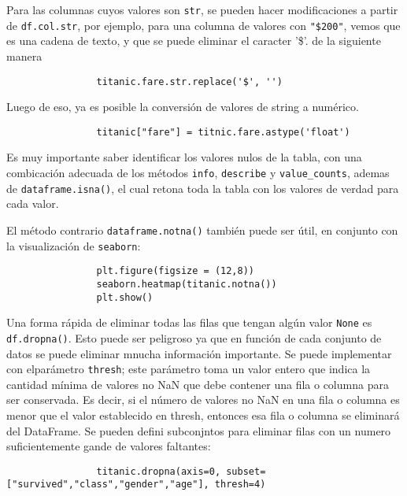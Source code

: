             Para las columnas cuyos valores son \texttt{str}, se pueden hacer modificaciones a partir de \texttt{df.col.str}, por ejemplo, para una columna de valores con \texttt{"\$200"}, vemos que es una cadena de texto, y que se puede eliminar el caracter '\$'. de la siguiente manera

            \begin{verbatim}
                titanic.fare.str.replace('$', '')
            \end{verbatim}

            Luego de eso, ya es posible la conversión de valores de string a numérico.
            
            \begin{verbatim}
                titanic["fare"] = titnic.fare.astype('float')
            \end{verbatim}

            Es muy importante saber identificar los valores nulos de la tabla, con una combicación adecuada de los métodos \texttt{info}, \texttt{describe} y \texttt{value\_counts}, ademas de \texttt{dataframe.isna()}, el cual retona toda la tabla con los valores de verdad para cada valor.

            El método contrario \texttt{dataframe.notna()} también puede ser útil, en conjunto con la visualización de \texttt{seaborn}:

            \begin{verbatim}
                plt.figure(figsize = (12,8))
                seaborn.heatmap(titanic.notna())
                plt.show()
            \end{verbatim}

            Una forma rápida de eliminar todas las filas que tengan algún valor \texttt{None} es \texttt{df.dropna()}. Esto puede ser peligroso ya que en función de cada conjunto de datos se puede eliminar mnucha información importante. Se puede implementar con elparámetro \texttt{thresh}; este parámetro toma un valor entero que indica la cantidad mínima de valores no NaN que debe contener una fila o columna para ser conservada. Es decir, si el número de valores no NaN en una fila o columna es menor que el valor establecido en thresh, entonces esa fila o columna se eliminará del DataFrame. Se pueden defini subconjntos para eliminar filas con un numero suficientemente gande de valores faltantes:

            \begin{verbatim}
                titanic.dropna(axis=0, subset=["survived","class","gender","age"], thresh=4)
            \end{verbatim}

